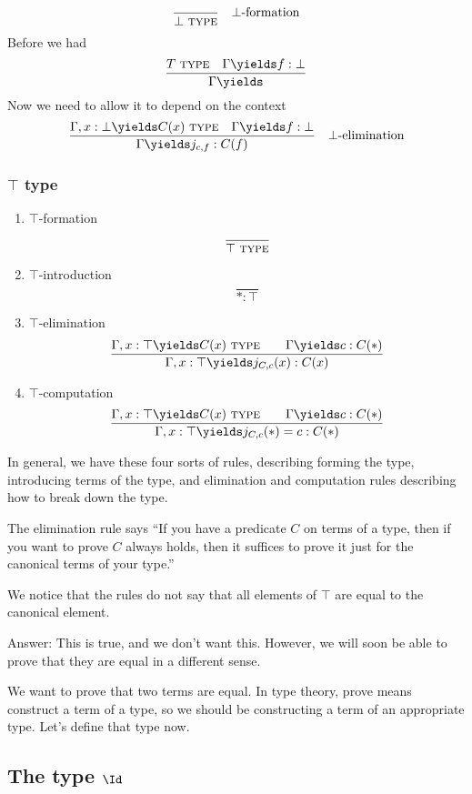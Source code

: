 \documentclass{article}
\newcommand\TYPE{\text{ \scshape{type}}}
\begin{document}
\[\frac{}{\bot\TYPE} \quad\text{$\bot$-formation}\]
Before we had 
\[\frac{T\TYPE\quad \Gamma\yields f:\bot}{\Gamma \yields 
}\]
Now we need to allow it to depend on the context
\[\frac{\Gamma,x:\bot \yields C(x)\TYPE \quad
\Gamma \yields f:\bot 
}{
    \Gamma \yields j_{c,f} : C(f)
}
\quad \text{$\bot$-elimination}
\]

\subsubsection{$\top$ type}

\begin{enumerate}
    \item $\top$-formation
        \[\frac{}{\top\TYPE}\]
    \item $\top$-introduction
        \[\frac{}{*:\top}\]
    \item $\top$-elimination
        \[ \frac{\Gamma, x:\top \yields C(x)\TYPE
        \qquad \Gamma \yields c:C(*)}{
            \Gamma,x:\top \yields j_{C,c}(x):C(x)
        }
        \]
    \item $\top$-computation
        \[ \frac{\Gamma, x:\top \yields C(x)\TYPE
        \qquad \Gamma \yields c:C(*)}{
            \Gamma,x:\top \yields 
            j_{C,c}(*)=c:C(*)
        }
        \]
\end{enumerate}
In general, we have these four sorts of rules, describing 
forming the type, introducing terms of the type, and elimination
and computation rules describing how to break down the type.

The elimination rule says 
``If you have a predicate $C$ on terms of a type, then 
if you want to prove $C$ always holds, then it suffices to 
prove it just for the canonical terms of your type.''

\begin{question}
    We notice that the rules do not say that all elements of 
    $\top$ are equal to the canonical element. 

    Answer: This is true, and we don't want this.
    However, we will soon be able to prove 
    that they are equal in a different sense.
\end{question}

We want to prove that two terms are equal. 
In type theory, prove means construct a term of a type, so 
we should be constructing a term of an appropriate type.
Let's define that type now.

\subsection{The type $\Id$ }
\end{document}
